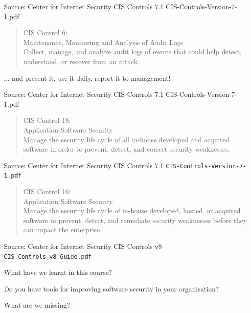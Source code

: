 \documentclass[Screen16to9,17pt]{foils}
\begin{document}
\begin{list1}
\item
\item
\item
\item
\end{list1}

Source: Center for Internet Security CIS Controls 7.1 CIS-Controls-Version-7-1.pdf


\begin{quote}
CIS Control 6:\\
Maintenance, Monitoring and Analysis of Audit Logs\\
Collect, manage, and analyze audit logs of events that could help detect, understand, or recover from an attack.
\end{quote}

\begin{list1}
\item ... and present it, use it daily, report it to management!
\item
\item
\item
\end{list1}

Source: Center for Internet Security CIS Controls 7.1 CIS-Controls-Version-7-1.pdf




\begin{quote}
CIS Control 18:\\
Application Software Security\\
Manage the security life cycle of all in-house developed and acquired software in order to prevent, detect, and correct security weaknesses.
\end{quote}

Source: Center for Internet Security CIS Controls 7.1 \verb+CIS-Controls-Version-7-1.pdf+

\begin{quote}
CIS Control 16:\\
Application Software Security\\
Manage the security life cycle of in-house developed, hosted,
or acquired software to prevent, detect, and remediate security
weaknesses before they can impact the enterprise.
\end{quote}

Source: Center for Internet Security CIS Controls v8 \verb+CIS_Controls_v8_Guide.pdf+




\begin{list2}
\item What have we learnt in this course?
\item Do you have tools for improving software security in your organisation?
\item What are we missing?
\end{list2}

\slidenext{}
\end{document}
